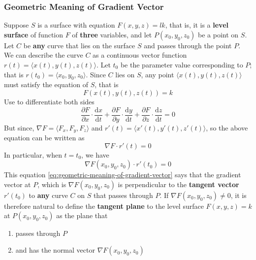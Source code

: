 \documentclass[math,code]{amznotes}
\theoremstyle{remark}
\begin{document}
\subsubsection{Geometric Meaning of Gradient Vector}
Suppose $S$ is a surface with equation $F(x,y,z)=lk$, that is, it is a {\color{red} \textbf{level surface}} of function $F$ of {\color{red} \textbf{three}} variables, and let $P(x_0,y_0,z_0)$ be a point on $S$. Let $C$ be {\color{red} \textbf{any}} curve that lies on the surface $S$ and passes through the point $P$. We can describe the curve $C$ as a continuous vector function $r(t)=\langle x(t), y(t), z(t) \rangle$. Let $t_0$ be the parameter  value corresponding to $P$; that is $r(t_0)=\langle x_0, y_0, z_0 \rangle$. Since $C$ lies on $S$, any point $\langle x(t), y(t), z(t) \rangle$ must satisfy the equation of $S$, that is
\begin{displaymath}
    F(x(t), y(t), z(t))=k
\end{displaymath}
Use  to differentiate both sides
\begin{displaymath}
    \frac{\partial F}{\partial x} \cdot \frac{\mathrm d x}{\mathrm d t} + \frac{\partial F}{\partial y} \cdot \frac{\mathrm d y}{\mathrm d t} + \frac{\partial F}{\partial z} \cdot \frac{\mathrm d z}{\mathrm d t} = 0
\end{displaymath}
But since, $\nabla F = \langle F_x, F_y, F_z \rangle$ and $r'(t) = \langle x'(t), y'(t), z'(t) \rangle$, so the above equation can be written as
\begin{displaymath}
    \nabla F \cdot r'(t) = 0
\end{displaymath}
In particular, when $t=t_0$, we have
\begin{equation} \label{eq:geometric-meaning-of-gradient-vector}
    \nabla F(x_0,y_0,z_0) \cdot r'(t_0) = 0
\end{equation}
This equation \eqref{eq:geometric-meaning-of-gradient-vector} says that the gradient vector at $P$, which is $\nabla F(x_0,y_0,z_0)$ is perpendicular to the {\color{red} \textbf{tangent vector}} $r'(t_0)$ to {\color{red} \textbf{any}} curve $C$ on $S$ that passes through $P$. If $\nabla F(x_0,y_0,z_0) \neq 0$, it is therefore natural to define the {\color{red} \textbf{tangent plane}} to the level surface $F(x,y,z) = k$ at $P(x_0,y_0,z_0)$ as the plane that
\begin{enumerate}
    \item passes through $P$
    \item and has the normal vector $\nabla F(x_0,y_0,z_0)$
\end{enumerate}
\end{document}
